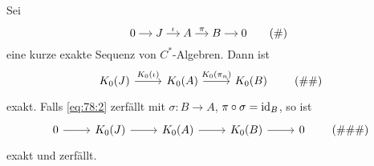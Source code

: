 \begin{proposition}[label=prop:78]
	Sei 
	\begin{equation}
		\begin{tikzcd}[cramped,sep=small]
			0 \rar & J \rar["\iota"] & A \rar["\pi"]  & B \rar & 0
		\end{tikzcd} \label{eq:78:1} \tag{\#}
	\end{equation}
	eine kurze exakte Sequenz von $C^*$-Algebren.
	Dann ist 
	\begin{equation}
		\begin{tikzcd}
			K_0(J) \rar["K_0(\iota)"] & K_0(A) \rar["K_0(\pi_n)"] & K_0(B)
		\end{tikzcd} \label{eq:78:2} \tag{\#\#}
	\end{equation}
	exakt.
	Falls \eqref{eq:78:2} zerfällt mit $\sigma \colon B \to A$, $\pi \circ \sigma = {\operatorname{id}_B}$, so ist 
	\begin{equation}
		\begin{tikzcd}
			0 \rar & K_0(J) \rar & K_0(A) \rar & K_0(B) \rar & 0
		\end{tikzcd} \label{eq:78:3} \tag{\#\#\#}
	\end{equation}
	exakt und zerfällt.
\end{proposition}
